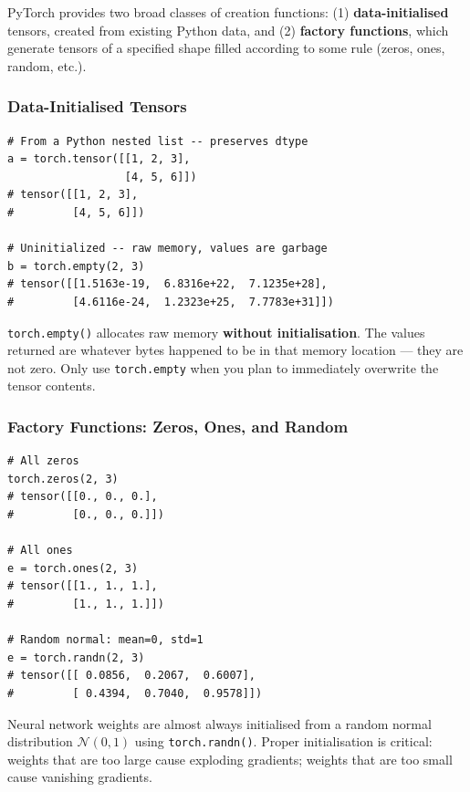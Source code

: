 \documentclass[12pt,a4paper]{article}
\newcommand{\tbf}[1]{\textbf{#1}}
\newcommand{\ttt}[1]{\texttt{#1}}
\begin{document}
PyTorch provides two broad classes of creation functions:
(1) \tbf{data-initialised} tensors, created from existing Python data, and
(2) \tbf{factory functions}, which generate tensors of a specified shape
filled according to some rule (zeros, ones, random, etc.).

\subsubsection{Data-Initialised Tensors}

\begin{lstlisting}[caption={Creating tensors from data (V04, 00:21:50).},
                   label={lst:from-data}]
# From a Python nested list -- preserves dtype
a = torch.tensor([[1, 2, 3],
                  [4, 5, 6]])
# tensor([[1, 2, 3],
#         [4, 5, 6]])

# Uninitialized -- raw memory, values are garbage
b = torch.empty(2, 3)
# tensor([[1.5163e-19,  6.8316e+22,  7.1235e+28],
#         [4.6116e-24,  1.2323e+25,  7.7783e+31]])
\end{lstlisting}

\begin{warningbox}
\ttt{torch.empty()} allocates raw memory \tbf{without initialisation}.
The values returned are whatever bytes happened to be in that memory
location --- they are not zero. Only use \ttt{torch.empty} when you
plan to immediately overwrite the tensor contents.
\end{warningbox}

\subsubsection{Factory Functions: Zeros, Ones, and Random}

\begin{lstlisting}[caption={Factory functions (V05, 00:25:24).},
                   label={lst:factory}]
# All zeros
torch.zeros(2, 3)
# tensor([[0., 0., 0.],
#         [0., 0., 0.]])

# All ones
e = torch.ones(2, 3)
# tensor([[1., 1., 1.],
#         [1., 1., 1.]])

# Random normal: mean=0, std=1
e = torch.randn(2, 3)
# tensor([[ 0.0856,  0.2067,  0.6007],
#         [ 0.4394,  0.7040,  0.9578]])
\end{lstlisting}

\begin{keyinsight}[title=Weight Initialisation with \ttt{torch.randn}]
Neural network weights are almost always initialised from a random normal
distribution $\mathcal{N}(0, 1)$ using \ttt{torch.randn()}. Proper
initialisation is critical: weights that are too large cause exploding
gradients; weights that are too small cause vanishing gradients.
\end{keyinsight}
\end{document}
